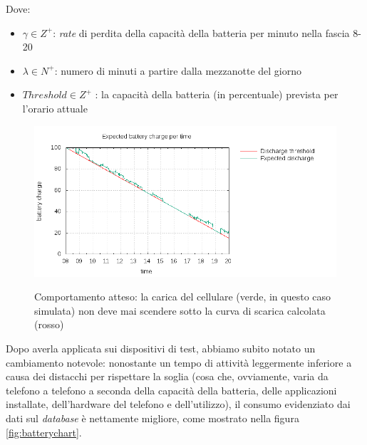 \documentclass[a4paper,10pt]{memoir}
\begin{document}
Dove:
\begin{itemize}
\item $\gamma \in Z^+$: \textit{rate} di perdita della capacità della batteria per minuto nella fascia 8-20
\item $\lambda \in N^+$: numero di minuti a partire dalla mezzanotte del giorno
\item $Threshold \in Z^+$ : la capacità della batteria (in percentuale) prevista per l'orario attuale
\end{itemize}

\begin{figure}[ht]
\centering
\caption{Comportamento atteso: la carica del cellulare (verde, in questo caso simulata) non deve mai scendere sotto la curva di scarica calcolata (rosso)}
\includegraphics[width=\textwidth]{database/expectedplot}
\label{fig:expectedchart}
\end{figure}

Dopo averla applicata sui dispositivi di test, abbiamo subito notato un cambiamento notevole: nonostante un tempo di attività leggermente inferiore a causa dei distacchi per rispettare la soglia (cosa che, ovviamente, varia da telefono a telefono a seconda della capacità della batteria, delle applicazioni installate, dell'hardware del telefono e dell'utilizzo), il consumo evidenziato dai dati sul \textit{database} è nettamente migliore, come mostrato nella figura \ref{fig:batterychart}.
\end{document}
